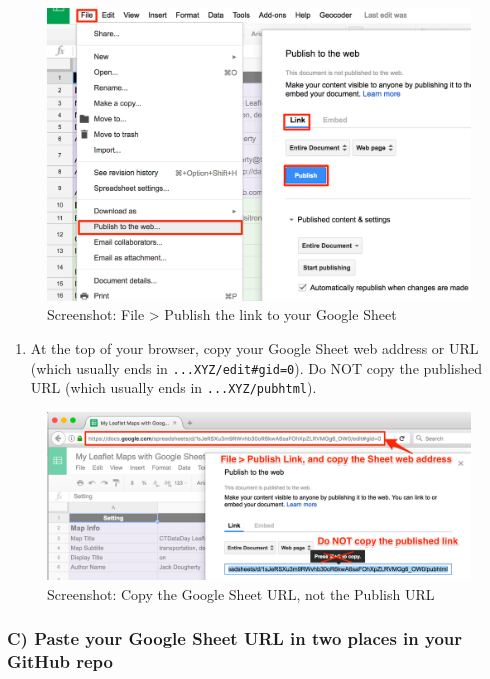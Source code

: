 \documentclass[
  english,
]{book}
\providecommand{\tightlist}{%
  \setlength{\itemsep}{0pt}\setlength{\parskip}{0pt}}
\begin{document}
\begin{figure}
\centering
\includegraphics{images/13-leaflet/lmwgs-file-publish.png}
\caption{Screenshot: File \textgreater{} Publish the link to your Google Sheet}
\end{figure}

\begin{enumerate}
\def\labelenumi{\arabic{enumi})}
\setcounter{enumi}{5}
\tightlist
\item
  At the top of your browser, copy your Google Sheet web address or URL (which usually ends in \texttt{...XYZ/edit\#gid=0}). Do NOT copy the published URL (which usually ends in \texttt{...XYZ/pubhtml}).
\end{enumerate}

\begin{figure}
\centering
\includegraphics{images/13-leaflet/lmwgs-copy-sheet-url-not-pub-url.png}
\caption{Screenshot: Copy the Google Sheet URL, not the Publish URL}
\end{figure}

\hypertarget{c-paste-your-google-sheet-url-in-two-places-in-your-github-repo-1}{%
\subsubsection*{C) Paste your Google Sheet URL in two places in your GitHub repo}\label{c-paste-your-google-sheet-url-in-two-places-in-your-github-repo-1}}
\end{document}
